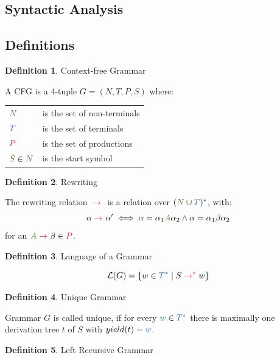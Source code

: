 \documentclass[10pt, landscape]{article}
\theoremstyle{definition}
\newtheorem{definition}{Definition}[section]
\newcommand{\Op}[1]{\textcolor{WildStrawberry}{#1}}
\newcommand{\LangOf}[1]{\mathcal{L} (#1)}
\newcommand{\derive}[1][]{\Op{\;\rightarrow_{#1}\;}}
\newcommand{\derives}[1][]{\Op{\;\rightarrow_{#1}^{*}\;}}
\newcommand{\nontermcolor}{OliveGreen}
\newcommand{\nt}[1]{\textcolor{\nontermcolor}{#1}}
\newcommand{\nonterms}{\nt{N}}
\newcommand{\ntA}{\nt{A}}
\newcommand{\ntS}{\nt{S}}
\newcommand{\termcolor}{NavyBlue}
\newcommand{\terms}{\textcolor{\termcolor}{T}}
\newcommand{\termws}{\textcolor{\termcolor}{T^*}}
\newcommand{\termW}{\textcolor{\termcolor}{w}}
\newcommand{\prodcolor}{WildStrawberry}
\newcommand{\prods}{\textcolor{\prodcolor}{P}}
\newcommand{\grammarwords}{(\nonterms \cup \terms)^{*}}
\begin{document}
\begin{multicols*}{3}
\columnbreak

\section{Syntactic Analysis}

\subsection*{Definitions}

\begin{definition}{Context-free Grammar}

  A CFG is a 4-tuple $G=(N, T, P, S)$ where:

  \begin{tabular}{l l}
    $\nonterms$       & is the set of non-terminals \\
    $\terms$          & is the set of terminals\\
    $\prods$          & is the set of productions\\
    $\ntS \in \nonterms$ & is the start symbol
  \end{tabular}

\end{definition}


\begin{definition}{Rewriting}

  The rewriting relation $\derive$ is a relation over $\grammarwords$, with:
  \[
    \alpha \derive \alpha' \iff \alpha = \alpha_{1}\ntA\alpha_{2} \land \alpha = \alpha_{1}\beta\alpha_{2}
  \]
  for an $\ntA \derive \beta \in \prods$.

\end{definition}

\begin{definition}{Language of a Grammar}

  \[
    \LangOf{G} = \{w \in \termws \mid S \derives w\}
  \]

\end{definition}


\begin{definition}{Unique Grammar}

  Grammar $G$ is called unique, if for every $\termW \in \termws$ there is maximally one derivation tree $t$ of $S$ with $yield(t) = \termW$.

\end{definition}


\begin{definition}{Left Recursive Grammar}


\end{definition}
\end{multicols*}
\end{document}

